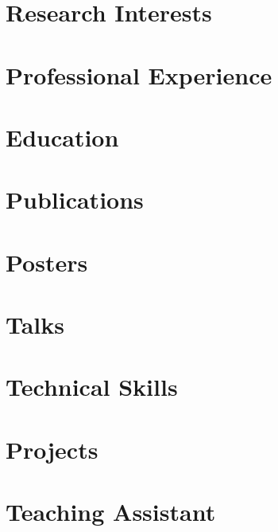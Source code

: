 \documentclass[10pt,a4paper,calibri]{moderncv}
\begin{document}
\makecvtitle{}
\vspace{-32pt}

\section{Research Interests}


\section{Professional Experience}


\section{Education}


\section{Publications}


\section{Posters}


\section{Talks}


% 

\section{Technical Skills}


\section{Projects}


\section{Teaching Assistant}

\end{document}
